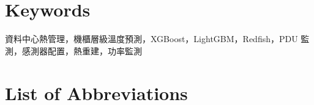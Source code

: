 \documentclass[12pt,a4paper]{article}
\begin{document}
\section*{Keywords}
資料中心熱管理，機櫃層級溫度預測，XGBoost，LightGBM，Redfish，PDU 監測，感測器配置，熱重建，功率監測

\newpage
\clearpage
\tableofcontents

\clearpage
{}
{}
\listoffigures

\clearpage
{}
{}
\listoftables

\clearpage
\newpage

\clearpage
{}
{}
\section*{List of Abbreviations}
\end{document}
